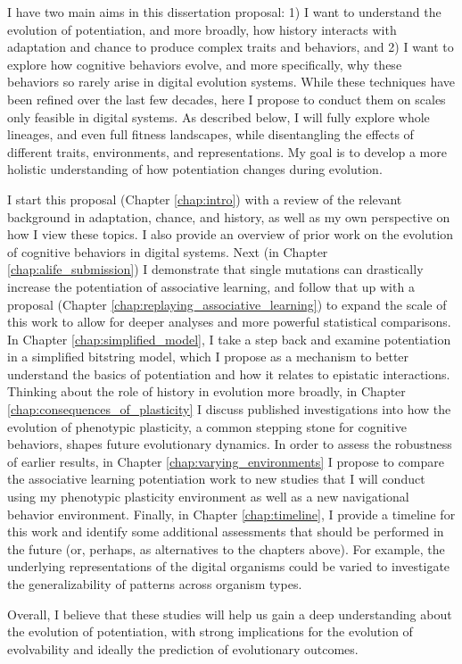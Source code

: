 I have two main aims in this dissertation proposal: 
1) I want to understand the evolution of potentiation, and more broadly, how history interacts with adaptation and chance to produce complex traits and behaviors, and 
2) I want to explore how cognitive behaviors evolve, and more specifically, why these behaviors so rarely arise in digital evolution systems. 
While these techniques have been refined over the last few decades, here I propose to conduct them on scales only feasible in digital systems.
As described below, I will fully explore whole lineages, and even full fitness landscapes, while disentangling the effects of different traits, environments, and representations.
My goal is to develop a more holistic understanding of how potentiation changes during evolution.




I start this proposal (Chapter \ref{chap:intro}) with a review of the relevant background in adaptation, chance, and history, as well as my own perspective on how I view these topics.  
I also provide an overview of prior work on the evolution of cognitive behaviors in digital systems. 
Next (in Chapter \ref{chap:alife_submission}) I demonstrate that single mutations can drastically increase the potentiation of associative learning, and follow that up with a proposal (Chapter \ref{chap:replaying_associative_learning}) to expand the scale of this work to allow for deeper analyses and more powerful statistical comparisons. 
In Chapter \ref{chap:simplified_model}, I take a step back and examine potentiation in a simplified bitstring model, which I propose as a mechanism to better understand the basics of potentiation and how it relates to epistatic interactions. 
Thinking about the role of history in evolution more broadly, in Chapter \ref{chap:consequences_of_plasticity} I discuss published investigations into how the evolution of phenotypic plasticity, a common stepping stone for cognitive behaviors, shapes future evolutionary dynamics.
In order to assess the robustness of earlier results, in Chapter \ref{chap:varying_environments} I propose to compare the associative learning potentiation work to new studies that I will conduct using my phenotypic plasticity environment as well as a new navigational behavior environment.
Finally, in Chapter \ref{chap:timeline}, I provide a timeline for this work and identify some additional assessments that should be performed in the future (or, perhaps, as alternatives to the chapters above).  For example, the underlying representations of the digital organisms could be varied to investigate the generalizability of patterns across organism types. 

Overall, I believe that these studies will help us gain a deep understanding about the evolution of potentiation, with strong implications for the evolution of evolvability and ideally the prediction of evolutionary outcomes.
